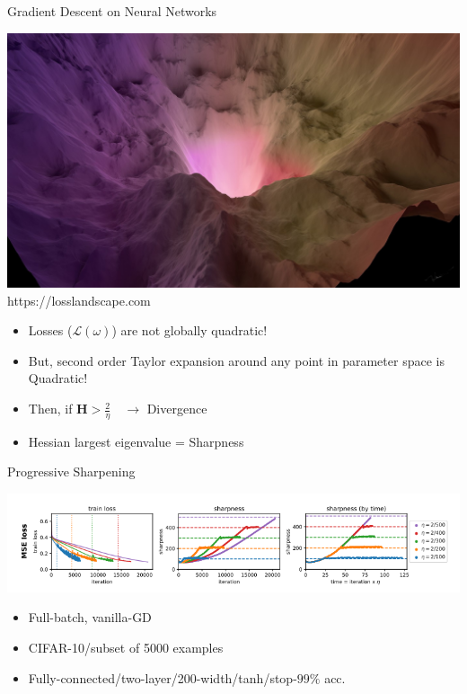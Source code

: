 \documentclass[aspectratio=169]{beamer}
\begin{document}
\begin{frame}{Gradient Descent on Neural Networks}
	\begin{minipage}{0.5\textwidth}
    \includegraphics[width=\textwidth]{Figures/loss.jpeg}
    \center
    \color{Pink}https://losslandscape.com
	\end{minipage}%
	\begin{minipage}{0.5\textwidth}
    \begin{itemize}
      \item Losses ($\mathcal{L}(\omega)$) are not globally quadratic!
      \item But, second order Taylor expansion around any point in parameter space is Quadratic! 
      \item Then, if $\mathbf{H}>\frac{2}{\eta}\quad\to$ \color{Pink} Divergence
      \item \color{Black}Hessian largest eigenvalue = Sharpness
    \end{itemize}
	\end{minipage}
\end{frame}

\begin{frame}{Progressive Sharpening}
	\begin{minipage}{\textwidth}
    \includegraphics[width=\textwidth]{Figures/prog_sharp.png}
	\end{minipage}
	\begin{minipage}{\textwidth}
    \begin{itemize}
      \item Full-batch, vanilla-GD
      \item CIFAR-10/subset of 5000 examples
      \item Fully-connected/two-layer/200-width/tanh/stop-$99\%$ acc.
    \end{itemize}
	\end{minipage}
\end{frame}
\end{document}
